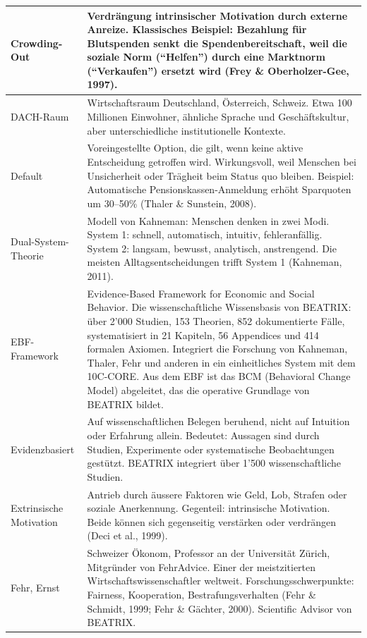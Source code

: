 \documentclass[11pt,a4paper]{article}
\begin{document}
\begin{longtable}{@{}L{4cm}L{10cm}@{}}
\midrule
Crowding-Out & Verdrängung intrinsischer Motivation durch externe Anreize. Klassisches Beispiel: Bezahlung für Blutspenden senkt die Spendenbereitschaft, weil die soziale Norm (``Helfen'') durch eine Marktnorm (``Verkaufen'') ersetzt wird (Frey \& Oberholzer-Gee, 1997). \\
\midrule
DACH-Raum & Wirtschaftsraum Deutschland, Österreich, Schweiz. Etwa 100 Millionen Einwohner, ähnliche Sprache und Geschäftskultur, aber unterschiedliche institutionelle Kontexte. \\
\midrule
Default & Voreingestellte Option, die gilt, wenn keine aktive Entscheidung getroffen wird. Wirkungsvoll, weil Menschen bei Unsicherheit oder Trägheit beim Status quo bleiben. Beispiel: Automatische Pensionskassen-Anmeldung erhöht Sparquoten um 30--50\% (Thaler \& Sunstein, 2008). \\
\midrule
Dual-System-Theorie & Modell von Kahneman: Menschen denken in zwei Modi. System 1: schnell, automatisch, intuitiv, fehleranfällig. System 2: langsam, bewusst, analytisch, anstrengend. Die meisten Alltagsentscheidungen trifft System 1 (Kahneman, 2011). \\
\midrule
EBF-Framework & Evidence-Based Framework for Economic and Social Behavior. Die wissenschaftliche Wissensbasis von BEATRIX: über 2'000 Studien, 153 Theorien, 852 dokumentierte Fälle, systematisiert in 21 Kapiteln, 56 Appendices und 414 formalen Axiomen. Integriert die Forschung von Kahneman, Thaler, Fehr und anderen in ein einheitliches System mit dem 10C-CORE. Aus dem EBF ist das BCM (Behavioral Change Model) abgeleitet, das die operative Grundlage von BEATRIX bildet. \\
\midrule
Evidenzbasiert & Auf wissenschaftlichen Belegen beruhend, nicht auf Intuition oder Erfahrung allein. Bedeutet: Aussagen sind durch Studien, Experimente oder systematische Beobachtungen gestützt. BEATRIX integriert über 1'500 wissenschaftliche Studien. \\
\midrule
Extrinsische Motivation & Antrieb durch äussere Faktoren wie Geld, Lob, Strafen oder soziale Anerkennung. Gegenteil: intrinsische Motivation. Beide können sich gegenseitig verstärken oder verdrängen (Deci et al., 1999). \\
\midrule
Fehr, Ernst & Schweizer Ökonom, Professor an der Universität Zürich, Mitgründer von FehrAdvice. Einer der meistzitierten Wirtschaftswissenschaftler weltweit. Forschungsschwerpunkte: Fairness, Kooperation, Bestrafungsverhalten (Fehr \& Schmidt, 1999; Fehr \& Gächter, 2000). Scientific Advisor von BEATRIX. \\

\end{longtable}
\end{document}
